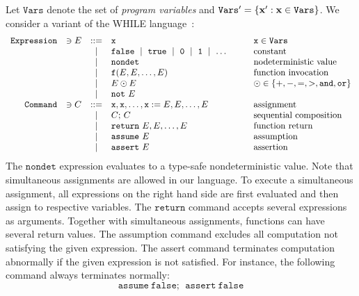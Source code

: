 
Let $\mathtt{Vars}$ denote the set of \emph{program variables} and
$\mathtt{Vars}' = \{ \textbf{x}' : \textbf{x} \in \mathtt{Vars} \}$.
We consider a variant of the WHILE language~\cite{}:
\begin{equation*}
  \begin{array}{rccll}
    \mathtt{Expression} & \ni E & ::= &
    \mathtt{x} & \mathtt{x} \in \mathtt{Vars}\\
    & & \mid &
    \mathtt{false}\ \mid\ \mathtt{true}\ \mid\ 
    \mathtt{0}\ \mid\ \mathtt{1}\ \mid\ \ldots\hspace{.06\textwidth} &
    \textmd{constant}\\
    & & \mid &
    \mathtt{nondet} & \textmd{nodeterministic value}\\
    & & \mid &
    \mathtt{f}(E, E, \ldots, E) &
    \textmd{function invocation}\\
    & & \mid &
    E \odot E  & \odot \in \{ +, -, =, >, \mathtt{and}, \mathtt{or} \}\\
    & & \mid & \mathtt{not}\ E\\
    \mathtt{Command} & \ni C & ::= &
    \mathtt{x}, \mathtt{x}, \ldots, \mathtt{x} := 
    E, E, \ldots, E & \textmd{assignment}\\
    & & \mid &
    C\mathtt{;}\ C &
    \textmd{sequential composition}\\
    & & \mid &
    \mathtt{return}\ E, E, \ldots, E & \textmd{function return}\\
    & & \mid &
    \mathtt{assume}\ E & \textmd{assumption}\\
    & & \mid &
    \mathtt{assert}\ E & \textmd{assertion}
  \end{array}
\end{equation*}
The $\mathtt{nondet}$ expression evaluates to a type-safe
nondeterministic value.
Note that simultaneous assignments are allowed in our language. To
execute a simultaneous assignment, all expressions on the right hand
side are first evaluated and then assign to respective variables. 
The $\mathtt{return}$ command accepts several expressions as arguments.
Together with simultaneous assignments, functions can have several
return values. 
The assumption command excludes all computation not satisfying the given
expression. The assert command terminates computation
abnormally if the given expression is not satisfied. For
instance, the following command always terminates normally:
\begin{equation*}
  \mathtt{assume\ false};\ \ \mathtt{assert\ false}
\end{equation*}




